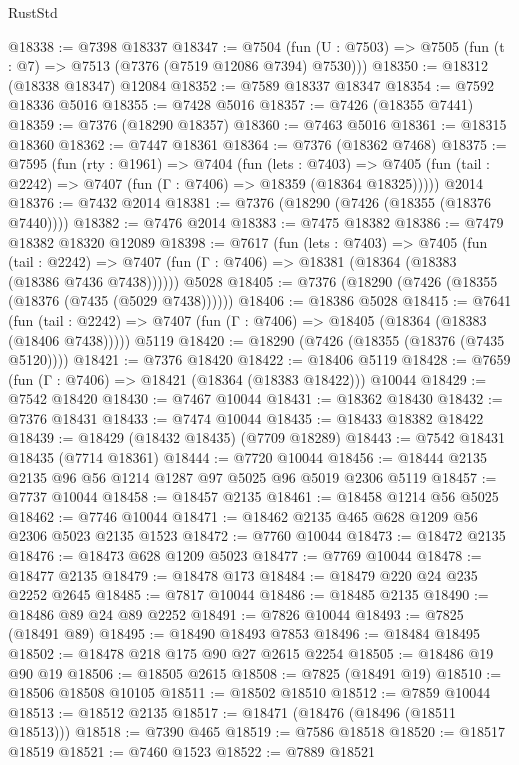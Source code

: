 \begin{lexlean}{RustStd}
\begin{coremodule}
@18338 := @7398 @18337
@18347 := @7504
    (fun (U : @7503) => @7505 (fun (t : @7) => @7513 (@7376 (@7519 @12086 @7394) @7530)))
@18350 := @18312 (@18338 @18347) @12084
@18352 := @7589 @18337 @18347
@18354 := @7592 @18336 @5016
@18355 := @7428 @5016
@18357 := @7426 (@18355 @7441)
@18359 := @7376 (@18290 @18357)
@18360 := @7463 @5016
@18361 := @18315 @18360
@18362 := @7447 @18361
@18364 := @7376 (@18362 @7468)
@18375 := @7595
    (fun (rty : @1961) =>
    @7404
      (fun (lets : @7403) =>
      @7405 (fun (tail : @2242) => @7407 (fun (Γ : @7406) => @18359 (@18364 @18325)))))
    @2014
@18376 := @7432 @2014
@18381 := @7376 (@18290 (@7426 (@18355 (@18376 @7440))))
@18382 := @7476 @2014
@18383 := @7475 @18382
@18386 := @7479 @18382 @18320 @12089
@18398 := @7617
    (fun (lets : @7403) =>
    @7405
      (fun (tail : @2242) =>
      @7407 (fun (Γ : @7406) => @18381 (@18364 (@18383 (@18386 @7436 @7438))))))
    @5028
@18405 := @7376 (@18290 (@7426 (@18355 (@18376 (@7435 (@5029 @7438))))))
@18406 := @18386 @5028
@18415 := @7641
    (fun (tail : @2242) => @7407 (fun (Γ : @7406) => @18405 (@18364 (@18383 (@18406 @7438)))))
    @5119
@18420 := @18290 (@7426 (@18355 (@18376 (@7435 @5120))))
@18421 := @7376 @18420
@18422 := @18406 @5119
@18428 := @7659 (fun (Γ : @7406) => @18421 (@18364 (@18383 @18422))) @10044
@18429 := @7542 @18420
@18430 := @7467 @10044
@18431 := @18362 @18430
@18432 := @7376 @18431
@18433 := @7474 @10044
@18435 := @18433 @18382 @18422
@18439 := @18429 (@18432 @18435) (@7709 @18289)
@18443 := @7542 @18431 @18435 (@7714 @18361)
@18444 := @7720 @10044
@18456 := @18444 @2135 @2135 @96 @56 @1214 @1287 @97 @5025 @96 @5019 @2306 @5119
@18457 := @7737 @10044
@18458 := @18457 @2135
@18461 := @18458 @1214 @56 @5025
@18462 := @7746 @10044
@18471 := @18462 @2135 @465 @628 @1209 @56 @2306 @5023 @2135 @1523
@18472 := @7760 @10044
@18473 := @18472 @2135
@18476 := @18473 @628 @1209 @5023
@18477 := @7769 @10044
@18478 := @18477 @2135
@18479 := @18478 @173
@18484 := @18479 @220 @24 @235 @2252 @2645
@18485 := @7817 @10044
@18486 := @18485 @2135
@18490 := @18486 @89 @24 @89 @2252
@18491 := @7826 @10044
@18493 := @7825 (@18491 @89)
@18495 := @18490 @18493 @7853
@18496 := @18484 @18495
@18502 := @18478 @218 @175 @90 @27 @2615 @2254
@18505 := @18486 @19 @90 @19
@18506 := @18505 @2615
@18508 := @7825 (@18491 @19)
@18510 := @18506 @18508 @10105
@18511 := @18502 @18510
@18512 := @7859 @10044
@18513 := @18512 @2135
@18517 := @18471 (@18476 (@18496 (@18511 @18513)))
@18518 := @7390 @465
@18519 := @7586 @18518
@18520 := @18517 @18519
@18521 := @7460 @1523
@18522 := @7889 @18521

\end{coremodule}
\end{lexlean}

